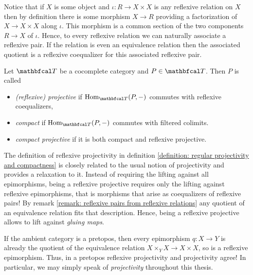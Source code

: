 \begin{remark}
	\label{remark: reflexive pairs from reflexive relations}
	
	Notice that if $X$ is some object and $\iota\colon R\to X\times X$ is any reflexive relation on $X$ then by definition there is some morphism $X\to R$ providing a factorization of $X\to X\times X$ along $\iota$. This morphism is a common section of the two components $R\to X$ of $\iota$. Hence, to every reflexive relation we can naturally associate a reflexive pair. If the relation is even an equivalence relation then the associated quotient is a reflexive coequalizer for this associated reflexive pair.
\end{remark}

\begin{definition}
	\label{definition: regular projectivity and compactness}
	
	Let $\category T$ be a cocomplete category and $P\in \category T$. Then $P$ is called
	\begin{itemize}
		\item
		\emph{(reflexive) projective} if $\Hom_\category T(P, -)$ commutes with reflexive coequalizers,
		
		\item 
		\emph{compact} if $\Hom_\category T(P, -)$ commutes with filtered colimits.
		
		\item 
		\emph{compact projective} if it is both compact and reflexive projective.
	\end{itemize}
\end{definition}

\begin{remark}
	The definition of reflexive projectivity in definition \ref{definition: regular projectivity and compactness} is closely related to the usual notion of projectivity and provides a relaxation to it. Instead of requiring the lifting against all epimorphisms, being a reflexive projective requires only the lifting against reflexive epimorphisms, that is morphisms that arise as coequalizers of reflexive pairs! By remark \ref{remark: reflexive pairs from reflexive relations} any quotient of an equivalence relation fits that description. Hence, being a reflexive projective allows to lift against \emph{gluing maps}.
	
	If the ambient category is a pretopos, then every epimorphism $q\colon X\to Y$ is already the quotient of the equivalence relation $X\times_Y X\to X\times X$, so is a reflexive epimorphism. Thus, in a pretopos reflexive projectivity and projectivity agree! In particular, we may simply speak of \emph{projectivity} throughout this thesis.
\end{remark}
